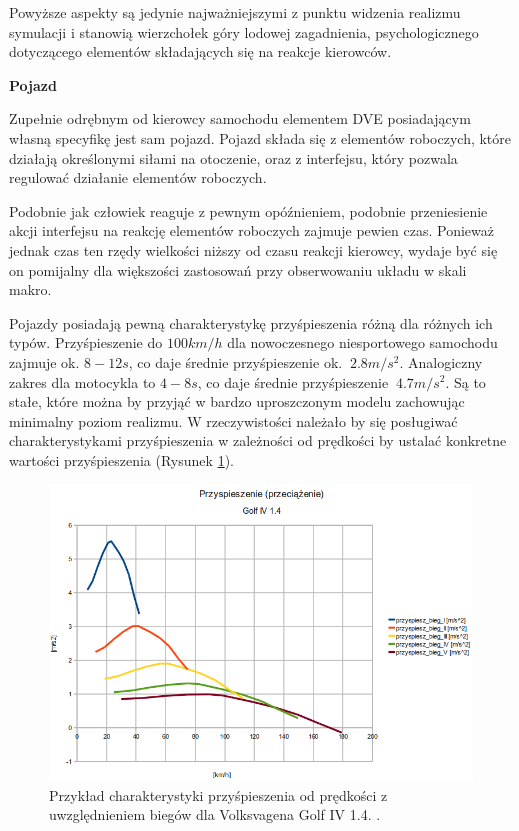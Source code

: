 {{}
\par{
Powyższe aspekty są jedynie najważniejszymi z punktu widzenia realizmu symulacji i stanowią wierzchołek góry lodowej zagadnienia, psychologicznego dotyczącego elementów składających się na reakcje kierowców.
}
\par{ }
\par{
\textbf{Pojazd}
}
\par{
Zupełnie odrębnym od kierowcy samochodu elementem DVE posiadającym własną specyfikę jest sam pojazd. Pojazd składa się z elementów roboczych, które działają określonymi siłami na otoczenie, oraz z interfejsu, który pozwala regulować działanie elementów roboczych.
}
\par{
Podobnie jak człowiek reaguje z pewnym opóźnieniem, podobnie przeniesienie akcji interfejsu na reakcję elementów roboczych zajmuje pewien czas. Ponieważ jednak czas ten rzędy wielkości niższy od czasu reakcji kierowcy, wydaje być się on pomijalny dla większości zastosowań przy obserwowaniu układu w skali makro.
}
\par{
Pojazdy posiadają pewną charakterystykę przyśpieszenia różną dla różnych ich typów. Przyśpieszenie do $100km/h$ dla nowoczesnego niesportowego samochodu zajmuje ok. $8-12s$, co daje średnie przyśpieszenie ok. $~2.8m/s^2$. Analogiczny zakres dla motocykla to $4-8s$, co daje średnie przyśpieszenie $~4.7m/s^2$. Są to stałe, które można by przyjąć w bardzo uproszczonym modelu zachowując minimalny poziom realizmu. W rzeczywistości należało by się posługiwać charakterystykami przyśpieszenia w zależności od prędkości by ustalać konkretne wartości przyśpieszenia (Rysunek \ref{golf}).
}
\begin{figure}[htb]
    \begin{center}
    	\includegraphics[width=\textwidth,keepaspectratio]{img/golf_acc}
	\caption{Przykład charakterystyki przyśpieszenia od prędkości z uwzględnieniem biegów dla Volksvagena Golf IV 1.4. \cite{Autokult}.}
	\label{golf}
    \end{center}
\end{figure}

}
